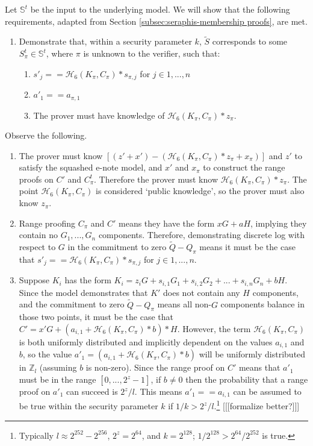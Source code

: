 \begin{appendices}
Let $\mathbb{S}^t$ be the input to the underlying model. We will show that the following requirements, adapted from Section \ref{subsec:seraphis-membership proofs}, are met.

\begin{enumerate}
    \item Demonstrate that, within a security parameter $k$, $\tilde{S}$ corresponds to some $S^t_{\pi} \in \mathbb{S}^t$, where $\pi$ is unknown to the verifier, such that:
    \begin{enumerate}
        \item $s'_j == \mathcal{H}_6(K_{\pi}, C_{\pi})*s_{\pi,j}$ for $j \in 1,...,n$
        \item $a'_1 == a_{\pi,1}$
        \item The prover must have knowledge of $\mathcal{H}_6(K_{\pi}, C_{\pi})*z_{\pi}$.
    \end{enumerate}
\end{enumerate}

Observe the following.

\begin{enumerate}
    \item The prover must know $[(z' + x') - (\mathcal{H}_6(K_{\pi}, C_{\pi})*z_{\pi} + x_{\pi})]$ and $z'$ to satisfy the squashed e-note model, and $x'$ and $x_{\pi}$ to construct the range proofs on $C'$ and $C^t_{\pi}$. Therefore the prover must know $\mathcal{H}_6(K_{\pi}, C_{\pi})*z_{\pi}$. The point $\mathcal{H}_6(K_{\pi}, C_{\pi})$ is considered `public knowledge', so the prover must also know $z_{\pi}$.

    \item Range proofing $C_{\pi}$ and $C'$ means they have the form $x G + a H$, implying they contain no $G_1,...,G_n$ components. Therefore, demonstrating discrete log with respect to $G$ in the commitment to zero $\tilde{Q} - Q_{\pi}$ means it must be the case that $s'_j == \mathcal{H}_6(K_{\pi}, C_{\pi})*s_{\pi,j}$ for $j \in 1,...,n$.

    \item Suppose $K_i$ has the form $K_i = z_i G + s_{i,1} G_1 + s_{i,2} G_2 + ... + s_{i,n} G_n + b H$. Since the model demonstrates that $K'$ does not contain any $H$ components, and the commitment to zero $\tilde{Q} - Q_{\pi}$ means all non-$G$ components balance in those two points, it must be the case that $C' = x' G + (a_{i,1} + \mathcal{H}_6(K_{\pi}, C_{\pi})*b)*H$. However, the term $\mathcal{H}_6(K_{\pi}, C_{\pi})$ is both uniformly distributed and implicitly dependent on the values $a_{i,1}$ and $b$, so the value $a'_1 = (a_{i,1} + \mathcal{H}_6(K_{\pi}, C_{\pi})*b)$ will be uniformly distributed in $\mathbb{Z}_l$ (assuming $b$ is non-zero). Since the range proof on $C'$ means that $a'_1$ must be in the range $[0,...,2^z - 1]$, if $b \neq 0$ then the probability that a range proof on $a'_1$ can succeed is $2^z/l$. This means $a'_1 == a_{i,1}$ can be assumed to be true within the security parameter $k$ if $1/k > 2^z/l$.\footnote{Typically $l \approx 2^{252} - 2^{256}$, $2^z = 2^{64}$, and $k = 2^{128}$; $1/2^{128} > 2^{64}/2^{252}$ is true.} [[[formalize better?]]]
\end{enumerate}


\end{appendices}
